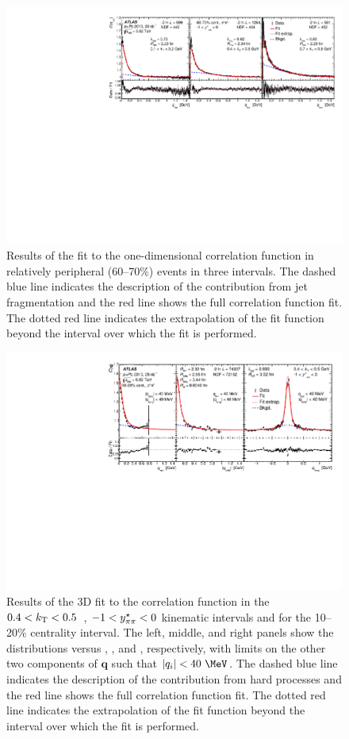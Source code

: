 \begin{figure}[t]
\centering
\includegraphics[width=\linewidth]{Cqinv_kt_cent8_e3_kys1.pdf}
\caption{Results of the fit to the one-dimensional correlation function in relatively peripheral (60--70\%) events in three \kt intervals.
The dashed blue line indicates the description of the contribution from jet fragmentation and the red line shows the full correlation function fit.
The dotted red line indicates the extrapolation of the fit function beyond the interval over which the fit is performed.
}
\label{fig:cqinv_cent8}
\end{figure}
\begin{figure}[t]
\centering
\includegraphics[width=\linewidth]{Cqosl_slices_cent3_e3_kt3_ys1.pdf}
\caption{Results of the 3D fit to the correlation function in the $0.4 < k_\mathrm{T} < 0.5$~\GeV, $-1 < y^{\star}_{\pi\pi} < 0$ kinematic intervals and for the 10--20\% centrality interval.
The left, middle, and right panels show the distributions versus \qout, \qside, and \qlong, respectively, with limits on the other two components of $\mathbf{q}$ such that $|q_i| < 40~\MeV$.
The dashed blue line indicates the description of the contribution from hard processes and the red line shows the full correlation function fit.
The dotted red line indicates the extrapolation of the fit function beyond the interval over which the fit is performed.
}
\label{fig:cqosl_slices}
\end{figure}

